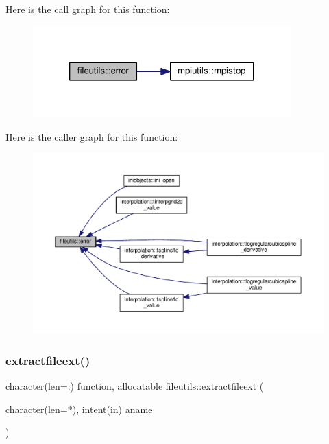 Here is the call graph for this function\+:
\nopagebreak
\begin{figure}[H]
\begin{center}
\leavevmode
\includegraphics[width=282pt]{namespacefileutils_ad8e0926f0aaad2fd9464ad5e4bc01db0_cgraph}
\end{center}
\end{figure}
Here is the caller graph for this function\+:
\nopagebreak
\begin{figure}[H]
\begin{center}
\leavevmode
\includegraphics[width=350pt]{namespacefileutils_ad8e0926f0aaad2fd9464ad5e4bc01db0_icgraph}
\end{center}
\end{figure}
\mbox{\label{namespacefileutils_a58b75841484f583d4f7da47c8fa217b6}} 
\subsubsection{\texorpdfstring{extractfileext()}{extractfileext()}}
{\footnotesize\ttfamily character(len=\+:) function, allocatable fileutils\+::extractfileext (\begin{DoxyParamCaption}\item[{character(len=$\ast$), intent(in)}]{aname }\end{DoxyParamCaption})\hspace{0.3cm}{\ttfamily [private]}}



